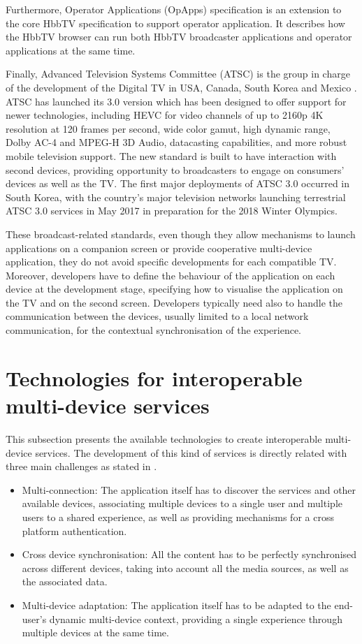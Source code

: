 Furthermore, Operator Applications (OpApps) \cite{opapp} specification is an extension to the core HbbTV specification to support operator application. It describes how the HbbTV browser can run both HbbTV broadcaster applications and operator applications at the same time.
 
Finally, Advanced Television Systems Committee (ATSC) \cite{ATSCWeb} is the group in charge of the development of the Digital TV in USA, Canada, South Korea and Mexico \cite{Chernock2016}. ATSC has launched its 3.0 version \cite{ATSC3} which has been designed to offer support for newer technologies, including HEVC for video channels of up to 2160p 4K resolution at 120 frames per second, wide color gamut, high dynamic range, Dolby AC-4 and MPEG-H 3D Audio, datacasting capabilities, and more robust mobile television support. The new standard is built to have interaction with second devices, providing opportunity to broadcasters to engage on consumers’ devices as well as the TV. The first major deployments of ATSC 3.0 occurred in South Korea, with the country's major television networks launching terrestrial ATSC 3.0 services in May 2017 in preparation for the 2018 Winter Olympics.

These broadcast-related standards, even though they allow mechanisms to launch applications on a companion screen or provide cooperative multi-device application, they do not avoid specific developments for each compatible TV. Moreover, developers have to define the behaviour of the application on each device at the development stage, specifying how to visualise the application on the TV and on the second screen. Developers typically need also to handle the communication between the devices, usually limited to a local network communication, for the contextual synchronisation of the experience.

\section{Technologies for interoperable multi-device services} \label{mdTech}
This subsection presents the available technologies to create interoperable multi-device services. The development of this kind of services is directly related with three main challenges as stated in \cite{thesisMikel}.

\begin{itemize}
	\item Multi-connection: The application itself has to discover the services and other available devices, associating multiple devices to a single user and multiple users to a shared experience, as well as providing mechanisms for a cross platform authentication.
	\item Cross device synchronisation: All the content has to be perfectly synchronised across different devices, taking into account all the media sources, as well as the associated data.
	\item Multi-device adaptation: The application itself has to be adapted to the end-user's dynamic multi-device context, providing a single experience through multiple devices at the same time.
\end{itemize}

